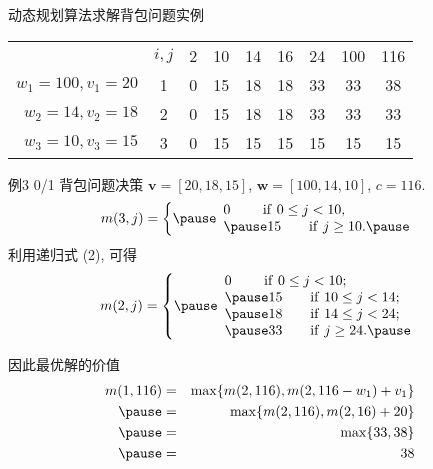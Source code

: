 \documentclass[fontset=fandol,UTF8,fleqn]{beamer}
\begin{document}
\begin{frame}{动态规划算法求解背包问题实例}
\begin{table}[c]
  \centering
  \begin{tabular}{rc|ccccccc}
& $i,j$ & 2  & 10 & 14 & 16 & 24 & 100 & 116 \\
\cline{2-9}
$w_1=100, v_1=20$ & 1  & 0 & 15 & 18 & 18 & 33 & 33 & 38 \\

$w_2=14, v_2=18$ & 2  & 0 & 15 & 18 & 18  & 33 & 33 & 33 \\

$w_3=10, v_3=15$ & 3  & 0 & 15 & 15 & 15 & 15 & 15 & 15 \\

  \end{tabular}
  \label{tab:knapsack}
\end{table}
\end{frame}

\begin{frame}{例3 0/1 背包问题决策}
$\mathbf{v}=[20,18,15]$, $\mathbf{w}=[100,14,10]$, $c=116$. \pause
\begin{eqnarray*}
  m(3,j)= \left\{ \pause
  \begin{array}{ll}
    0\ \qquad  \mathrm{if}\ 0\leq j<10,    \\ \pause
15 \qquad \mathrm{if}\  j\geq 10.  \pause
\end{array}\right.  
\end{eqnarray*} \pause
利用递归式 (2), 可得  
\begin{eqnarray*} 
  m(2, j)= \left\{ \pause
    \begin{array}{ll}
      0 \qquad\ \mathrm{if}\ 0\leq j<10;   \\ \pause
      15 \qquad \mathrm{if}\ 10\leq j<14;   \\ \pause
      18 \qquad \mathrm{if}\ 14\leq j<24;  \\ \pause
      33 \qquad \mathrm{if}\ j\geq 24.    \pause
    \end{array}\right.  
  \end{eqnarray*} \pause

  因此最优解的价值 
  \begin{eqnarray*}
    m(1,116)& = & \mathrm{max}\{m(2,116), m(2,116-w_1)+v_1\}   \\ \pause
            & = & \mathrm{max}\{m(2,116), m(2,16)+20\}   \\ \pause
            & = & \mathrm{max}\{33,38\}   \\ \pause
            & = & 38   
\end{eqnarray*}
\end{frame}
\end{document}
